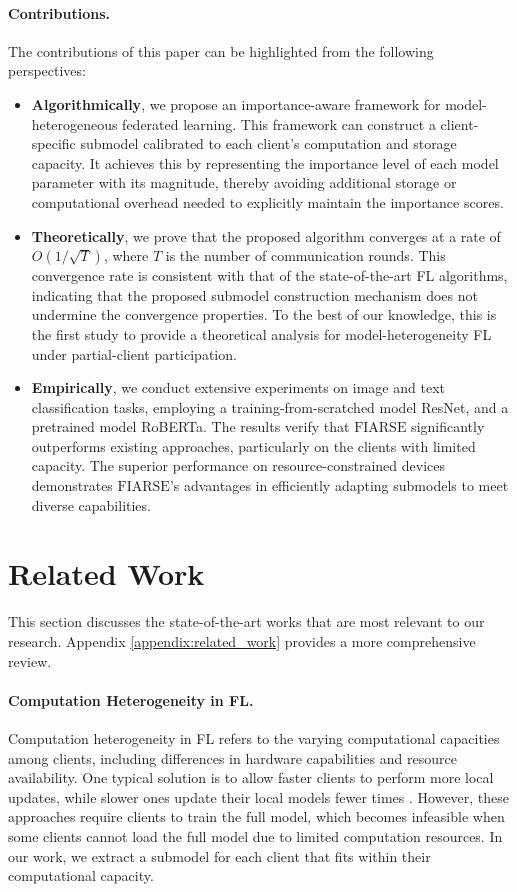\documentclass{article}
\renewcommand{\cite}{\citep}
\theoremstyle{plain}
\theoremstyle{definition}
\theoremstyle{remark}
\newcommand{\algo}{\ensuremath{\text{FIARSE}}\xspace}
\begin{document}
\paragraph{Contributions.} The contributions of this paper can be highlighted from the following perspectives: 
\begin{itemize}[leftmargin=1em]
\item \textbf{Algorithmically}, we propose an importance-aware framework for model-heterogeneous federated learning. This framework can construct a client-specific submodel calibrated to each client's computation and storage capacity. It achieves this by representing the importance level of each model parameter with its magnitude, thereby avoiding additional storage or computational overhead needed to explicitly maintain the importance scores.
\item \textbf{Theoretically}, we prove that the proposed algorithm converges at a rate of $O\left(1/\sqrt{T}\right)$, where $T$ is the number of communication rounds. This convergence rate is consistent with that of the state-of-the-art FL algorithms, indicating that the proposed submodel construction mechanism does not undermine the convergence properties. To the best of our knowledge, this is the first study to provide a theoretical analysis for model-heterogeneity FL under partial-client participation.
\item \textbf{Empirically}, we conduct extensive experiments on image and text classification tasks, employing a training-from-scratched model ResNet, and a pretrained model RoBERTa. The results verify that \algo significantly outperforms existing approaches, particularly on the clients with limited capacity. The superior performance on resource-constrained devices demonstrates \algo's advantages in efficiently adapting submodels to meet diverse capabilities.
\end{itemize}

\section{Related Work}
This section discusses the state-of-the-art works that are most relevant to our research. Appendix \ref{appendix:related_work} provides a more comprehensive review. 

\paragraph{Computation Heterogeneity in FL.}  
Computation heterogeneity in FL refers to the varying computational capacities among clients, including differences in hardware capabilities and resource availability. One typical solution is to allow faster clients to perform more local updates, while slower ones update their local models fewer times \cite{wang2020tackling, li2020federated, mitra2021linear, luo2021cost, shin2022fedbalancer, wu2023deterioration}. However, these approaches require clients to train the full model, which becomes infeasible when some clients cannot load the full model due to limited computation resources. In our work, we extract a submodel for each client that fits within their computational capacity. 
\end{document}
